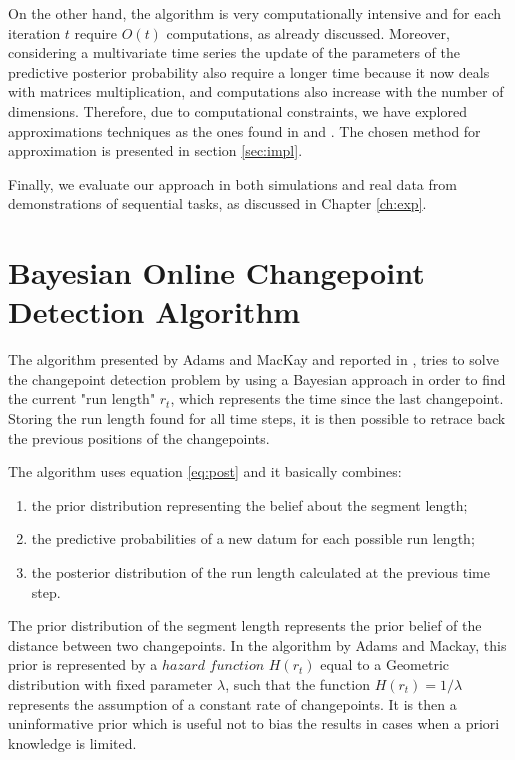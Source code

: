 \documentclass[11pt,twoside,a4paper]{report}
\begin{document}
On the other hand, the algorithm is very computationally intensive and for each iteration $t$ require $O(t)$ computations, as already discussed. Moreover, considering a multivariate time series the update of the parameters of the predictive posterior probability also require a longer time because it now deals with matrices multiplication, and computations also increase with the number of dimensions. Therefore, due to computational constraints, we have explored approximations techniques as the ones found in \cite{fearn2} and \cite{champ}. The chosen method for approximation is presented in section \ref{sec:impl}.

Finally, we evaluate our approach in both simulations and real data from demonstrations of sequential tasks, as discussed in Chapter \ref{ch:exp}.


\newpage

\chapter{Bayesian Online Changepoint Detection Algorithm}

The algorithm presented by Adams and MacKay and reported in \cite{adams}, tries to solve the changepoint detection problem by using a Bayesian approach in order to find the current "run length" $r_t$, which represents the time since the last changepoint. Storing the run length found for all time steps, it is then possible to retrace back the previous positions of the changepoints. 

The algorithm uses equation \ref{eq:post} and it basically combines:
\begin{enumerate}
\item the prior distribution representing the belief about the segment length;
\item the predictive probabilities of a new datum for each possible run length;
\item the posterior distribution of the run length calculated at the previous time step.
\end{enumerate}

The prior distribution of the segment length represents the prior belief of the distance between two changepoints. In the algorithm by Adams and Mackay, this prior is represented by a $hazard$ $function$ $H(r_t)$ equal to a Geometric distribution with fixed parameter $\lambda$, such that the function $H(r_t) = 1/\lambda$ represents the assumption of a constant rate of changepoints. It is then a uninformative prior which is useful not to bias the results in cases when a priori knowledge is limited.
\end{document}
